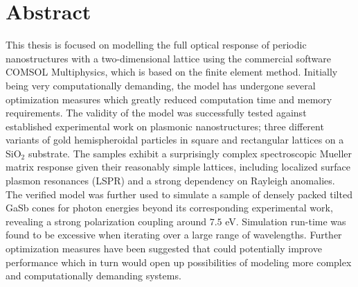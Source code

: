 \clearpage
{} 				
\setcounter{page}{1}

\pagestyle{fancy}
\fancyhf{}
\renewcommand{\chaptermark}[1]{\markboth{\chaptername\ \thechapter.\ #1}{}}
\renewcommand{\sectionmark}[1]{\markright{\thesection\ #1}}
\renewcommand{\headrulewidth}{0.1ex}
\renewcommand{\footrulewidth}{0.1ex}
\fancyfoot[LE,RO]{\thepage}
\fancypagestyle{plain}{\fancyhf{}\fancyfoot[LE,RO]{\thepage}\renewcommand{\headrulewidth}{0ex}}

\section*{\Huge Abstract}

\noindent 
This thesis is focused on modelling the full optical response of periodic nanostructures with a two-dimensional lattice using the commercial software COMSOL Multiphysics, which is based on the finite element method. Initially being very computationally demanding, the model has undergone several optimization measures which greatly reduced computation time and memory requirements. The validity of the model was successfully tested against established experimental work on plasmonic nanostructures; three different variants of gold hemispheroidal particles in square and rectangular lattices on a SiO$_2$ substrate. The samples exhibit a surprisingly complex spectroscopic Mueller matrix response given their reasonably simple lattices, including localized surface plasmon resonances (LSPR) and a strong dependency on Rayleigh anomalies. The verified model was further used to simulate a sample of densely packed tilted GaSb cones for photon energies beyond its corresponding experimental work, revealing a strong polarization coupling around $7.5$ eV. Simulation run-time was found to be excessive when iterating over a large range of wavelengths. Further optimization measures have been suggested that could potentially improve performance which in turn would open up possibilities of modeling more complex and computationally demanding systems.






\clearpage